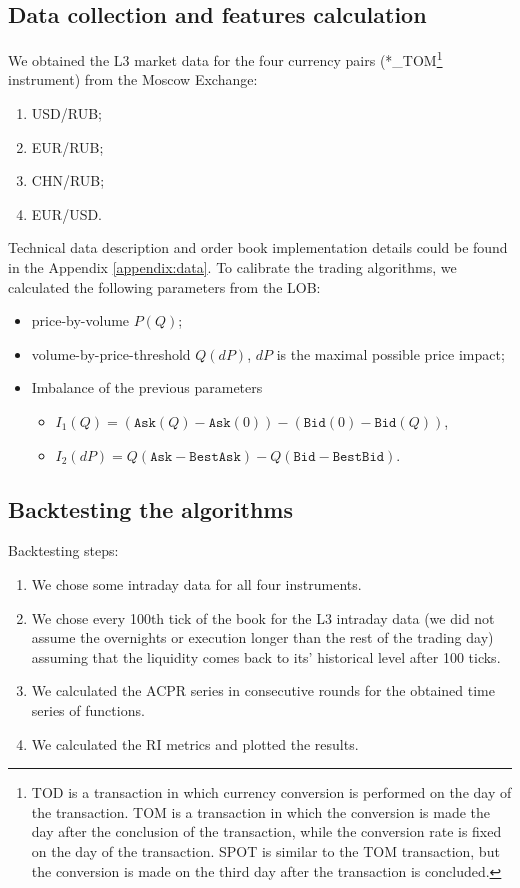     \subsection{Data collection and features calculation}
        We obtained the L3 market data for the four currency pairs (*\_TOM\footnote{TOD is a transaction in which currency conversion is performed on the day of the transaction.
        TOM is a transaction in which the conversion is made the day after the conclusion of the transaction, while the conversion rate is fixed on the day of the transaction.
        SPOT is similar to the TOM transaction, but the conversion is made on the third day after the transaction is concluded.} instrument) from the Moscow Exchange:
        \begin{enumerate}
            \item USD/RUB; 
            \item EUR/RUB; 
            \item CHN/RUB;
            \item EUR/USD.
        \end{enumerate} 
        Technical data description and order book implementation details could be found in the Appendix \ref{appendix:data}.
        To calibrate the trading algorithms, we calculated the following parameters from the LOB:
        \begin{itemize}
            \item price-by-volume $P(Q)$;
            \item volume-by-price-threshold $Q(dP)$, $dP$ is the maximal possible price impact;
            \item Imbalance of the previous parameters\begin{itemize}
                \item $I_1(Q) = (\texttt{Ask}(Q) - \texttt{Ask}(0)) - (\texttt{Bid}(0) - \texttt{Bid}(Q))$,
                \item $I_2(dP) = Q(\texttt{Ask} - \texttt{BestAsk}) - Q(\texttt{Bid} - \texttt{BestBid})$.
            \end{itemize}
        \end{itemize}

    \subsection{Backtesting the algorithms}
        Backtesting steps:
        \begin{enumerate}
            \item We chose some intraday data for all four instruments.
            \item We chose every 100th tick of the book for the L3 intraday data (we did not assume the overnights or execution longer than the rest of the trading day) assuming that the liquidity comes back to its' historical level after 100 ticks.
            \item We calculated the ACPR series in consecutive rounds for the obtained time series of functions.
            \item We calculated the RI metrics and plotted the results.
        \end{enumerate}